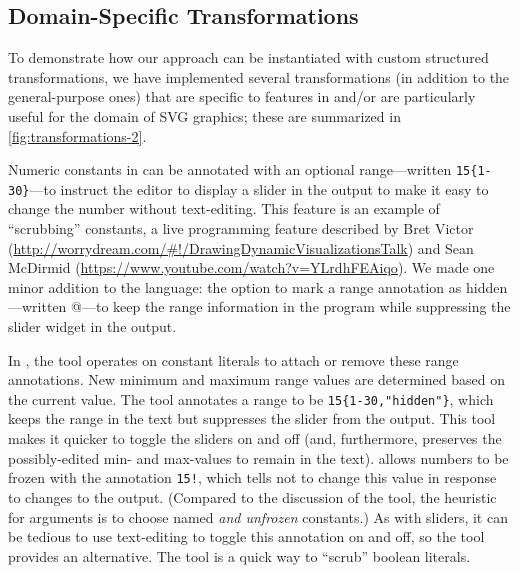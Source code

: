 \subsection{Domain-Specific Transformations}
\label{sec:little-transformations-sns}

To demonstrate how our approach can be instantiated with custom
structured transformations, we have implemented several
transformations (in addition to the general-purpose ones)
that are specific to features in \sns{} and/or are particularly
useful for the domain of SVG graphics;
these are summarized in \autoref{fig:transformations-2}.



Numeric constants in \little{} can be annotated with an optional
range---written \verb+15{1-30}+---to instruct the \sns{}
editor to display a slider in the
output to make it easy to change the number without text-editing.
This feature is an example of ``scrubbing'' constants, a live
programming feature described by Bret Victor
(\url{http://worrydream.com/#!/DrawingDynamicVisualizationsTalk})
and Sean McDirmid
(\url{https://www.youtube.com/watch?v=YLrdhFEAiqo}).
We made one minor addition to the \little{} language: the option to
mark a range annotation as hidden---written
@---to keep the range information in the
program while suppressing the slider widget in the output.

In \deuce{}, the  tool operates on constant literals to attach
or remove these range annotations. New minimum and maximum range
values are determined based on the current value.
The  tool annotates a
range to be \verb+15{1-30,"hidden"}+, which keeps the range in the
text but suppresses the slider from the output. This tool makes it
quicker to toggle the sliders on and off (and, furthermore, preserves
the possibly-edited min- and max-values to remain in the text).
\sns{} allows numbers to be frozen with the annotation \verb+15!+,
which tells \sns{} not to change this value in response to changes to
the output. (Compared to the discussion of the  tool,
the heuristic for arguments is to choose named \emph{and unfrozen}
constants.)
As with sliders, it can be tedious to use text-editing to
toggle this annotation on and off, so the  tool
provides an alternative.
The  tool is a quick way to ``scrub'' boolean literals.


